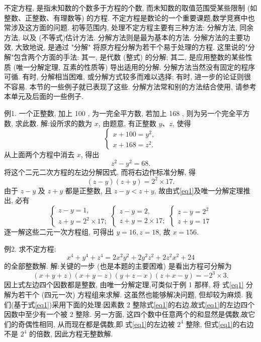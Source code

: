 
不定方程, 是指未知数的个数多于方程的个数, 而未知数的取值范围受某些限制 (如整数、正整数、有理数等) 的方程.
不定方程是数论的一个重要课题,数学竞赛中也常涉及这方面的问题.
初等范围内, 处理不定方程主要有三种方法: 分解方法, 同余方法, 以及 (不等式)估计方法.
分解方法则是最为基本的方法.
分解方法的主要功效, 大致地说, 是通过 "分解" 将原方程分解为若干个易于处理的方程.
这里说的"分解"包含两个方面的手法: 其一, 是代数 (整式) 的分解; 其二, 是应用整数的某些性质 (唯一分解定理, 互素的性质等) 导出适用的分解.
分解方法当然没有固定的程序可循.
有时, 分解相当困难, 或分解方式较多而难以选择; 有时, 进一步的论证则很不容易.
本节的一些例子就已表现了这些.
分解方法常和别的方法结合使用, 请参考本单元及后面的一些例子.



例1. 一个正整数, 加上 100 , 为一完全平方数, 若加上 168 , 则为另一个完全平方数, 求此数.
解:设所求的数为 $x$, 由题意, 有正整数 $y 、 z$, 使得
$$
\left\{\begin{array}{l}
x+100=y^2, \\
x+168=z^2 .
\end{array}\right.
$$
从上面两个方程中消去 $x$, 得出
$$
z^2-y^2=68 .
$$
将这个二元二次方程的左边分解因式, 而将右边作标准分解, 得
$$
(z-y)(z+y)=2^2 \times 17 . \label{eq1}
$$
由于 $z-y$ 及 $z+y$ 都是正整数, 且 $z-y<z+y$, 故由式\ref{eq1}及唯一分解定理推出, 必有
$$
\left\{\begin{array} { l } 
{ z - y = 1 , } \\
{ z + y = 2 ^ { 2 } \times 1 7 ; }
\end{array} \left\{\begin{array} { l } 
{ z - y = 2 , } \\
{ z + y = 2 \times 1 7 ; }
\end{array} \left\{\begin{array}{l}
z-y=2^2 \\
z+y=17
\end{array}\right.\right.\right. 
$$
逐一解这些二元一次方程组, 可得出 $y=16, z=18$, 故 $x=156$.



例2. 求不定方程:
$$
x^4+y^4+z^4=2 x^2 y^2+2 y^2 z^2+2 z^2 x^2+24
$$
的全部整数解.
解:关键的一步 (也是本题的主要困难) 是看出方程可分解为
$$
(x+y+z)(x+y-z)(y+z-x)(z+x-y)=-2^3 \times 3 . \label{eq1}
$$
因上式左边四个因数都是整数, 由唯一分解定理,可类似于例 1 那样, 将 式\ref{eq1} 分解为若干个 (四元一次) 方程组来求解.
这虽然也能够解决问题, 但却较为麻烦.
我们(基于式\ref{eq1})采用下面的处理:因素数 2 整除式\ref{eq1}的右边,故式\ref{eq1}的左边四个因数中至少有一个被 2 整除.
另一方面, 这四个数中任意两个的和显然是偶数,故它们的奇偶性相同, 从而现在都是偶数,即 式\ref{eq1}的左边被 $2^4$ 整除, 但式\ref{eq1}的右边不是 $2^4$ 的倍数, 因此方程无整数解.



